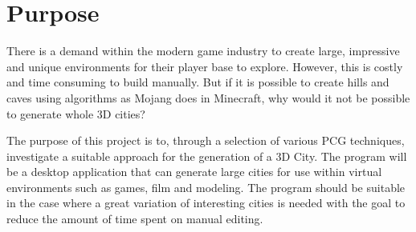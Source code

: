 \section{Purpose}
There is a demand within the modern game industry to create large, impressive and unique environments for their player base to explore.
However, this is costly and time consuming to build manually.
But if it is possible to create hills and caves using algorithms as Mojang does in Minecraft, why would it not be possible to generate whole 3D cities?

The purpose of this project is to, through a selection of various PCG techniques, investigate a suitable approach for the generation of a 3D City.
The program will be a desktop application that can generate large cities for use within virtual environments such as games, film and modeling.
The program should be suitable in the case where a great variation of interesting cities is needed with the goal to reduce the amount of time spent on manual editing.

